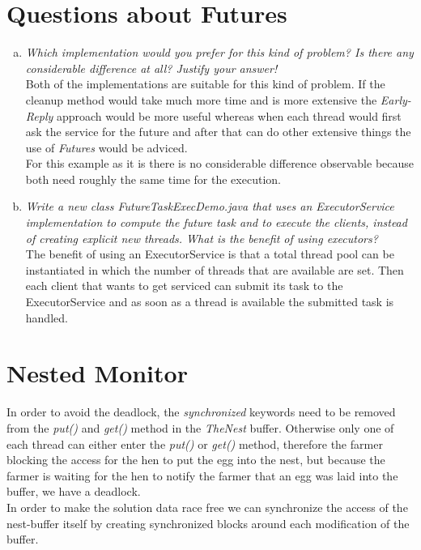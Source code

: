 \documentclass{report}
\begin{document}
	\section{Questions about Futures}
	\startsection
		\begin{enumerate}[a)]
			\item \textit{Which implementation would you prefer for this kind of problem? Is there any considerable difference at all? Justify your answer!} \\
			Both of the implementations are suitable for this kind of problem. If the cleanup method would take much more time and is more extensive the \textit{Early-Reply} approach would be more useful whereas when each thread would first ask the service for the future and after that can do other extensive things the use of \textit{Futures} would be adviced. \\
			For this example as it is there is no considerable difference observable because both need roughly the same time for the execution.
			\item \textit{Write a new class FutureTaskExecDemo.java that uses an ExecutorService implementation to compute the future task and to execute the clients, instead of creating explicit new threads. What is the benefit of using executors?} \\
			The benefit of using an ExecutorService is that a total thread pool can be instantiated in which the number of threads that are available are set. Then each client that wants to get serviced can submit its task to the ExecutorService and as soon as a thread is available the submitted task is handled.
		\end{enumerate}
	\closesection
	
	\section{Nested Monitor}
	\startsection
		In order to avoid the deadlock, the \textit{synchronized} keywords need to be removed from the \textit{put()} and \textit{get()} method in the \textit{TheNest} buffer. Otherwise only one of each thread can either enter the \textit{put()} or \textit{get()} method, therefore the farmer blocking the access for the hen to put the egg into the nest, but because the farmer is waiting for the hen to notify the farmer that an egg was laid into the buffer, we have a deadlock. \\
		In order to make the solution data race free we can synchronize the access of the nest-buffer itself by creating synchronized blocks around each modification of the buffer.
	\closesection
	
\end{document}
